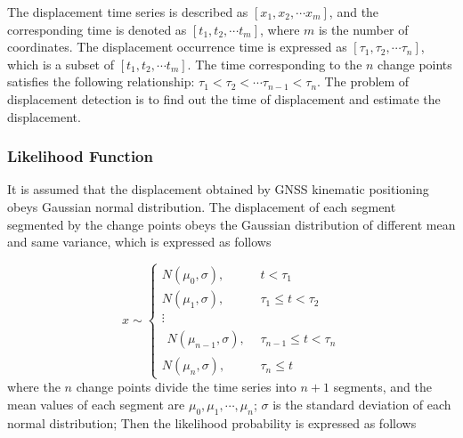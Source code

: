 \documentclass[final,3p,times]{elsarticle}
\begin{document}
	The displacement time series is described as $\left[ {{x_1},{x_2}, \cdots {x_m}} \right]$, and the corresponding time is denoted as $\left[ {{t_1},{t_2}, \cdots {t_m}} \right]$, where $m$ is the number of \textcolor{r_s}{coordinates}. The displacement occurrence time is expressed as $\left[ {{\tau _1},{\tau _2}, \cdots {\tau _n}} \right]$, which is a subset of $\left[ {{t_1},{t_2}, \cdots {t_m}} \right]$.  
	The time corresponding to the $n$ change points satisfies the following relationship: $ {{\tau _1}<{\tau _2}<\cdots {\tau _{n-1}}<{\tau _n}} $.
	The problem of displacement detection is to find out the time of displacement and estimate the displacement.
	

	
	\subsubsection{Likelihood Function}
	It is assumed that the displacement obtained by GNSS kinematic positioning obeys Gaussian normal distribution.  The displacement of each segment segmented by the change points obeys the Gaussian distribution of different mean and same variance, which is expressed as follows
	
	\begin{equation}\label{eq_ts_cps}
	x \sim \left\{ {\begin{array}{*{20}{r}}
		{N({\mu _0},\sigma ),}&{t < {\tau _1}}\\
		{N({\mu _1},\sigma ),}&{{\tau _1} \le t < {\tau _2}}\\
		\vdots &{}\\
		{\begin{array}{*{20}{c}}
			{N({\mu _{n-1}},\sigma ),}
			\end{array}}&{{\tau _{n - 1}} \le t < {\tau _n}}\\
		{N({\mu _{n}},\sigma ),}&{{\tau _n} \le t}
		\end{array}} \right.
	\end{equation}
	where the $n$ change points divide the time series into $n+1$ segments, and the mean values of each segment are ${\mu _0},{\mu _1},\cdots,{\mu _n}$; $\sigma$ is the standard deviation of each normal distribution; Then the likelihood probability is expressed as follows
	
\end{document}
